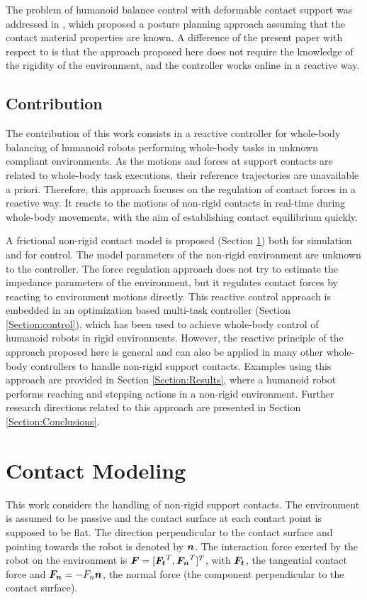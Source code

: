 \documentclass[letterpaper, 10 pt, conference]{ieeeconf}  %
\newcommand{\vect}[1]{\mbox{\boldmath${#1}$}}%
\begin{document}
The problem of humanoid balance control with deformable contact support was addressed in \cite{Bouyarmane11b}, which proposed a posture planning approach assuming that the contact material properties are known. A difference of the present paper with respect to \cite{Bouyarmane11b} is that the approach proposed here does not require the knowledge of the rigidity of the environment, and the controller works online in a reactive way.

\subsection{Contribution}
The contribution of this work consists in a reactive controller for whole-body balancing of humanoid robots performing whole-body tasks in unknown compliant environments. As the motions and forces at support contacts are related to whole-body task executions, their reference trajectories are unavailable a priori. Therefore, this approach focuses on the regulation of contact forces in a reactive way. It reacts to the motions of non-rigid contacts in real-time during whole-body movements, with the aim of establishing contact equilibrium quickly. 

A frictional non-rigid contact model is proposed (Section \ref{Section:modeling}) both for simulation and for control. The model parameters of the non-rigid environment are unknown to the controller. The force regulation approach does not try to estimate the impedance parameters of the environment, but it regulates contact forces by reacting to environment motions directly. This reactive control approach is embedded in an optimization based multi-task controller (Section \ref{Section:control}), which has been used to achieve whole-body control of humanoid robots in rigid environments. However, the reactive principle of the approach proposed here is general and can also be applied in many other whole-body controllers to handle non-rigid support contacts. Examples using this approach are provided in Section \ref{Section:Results}, where a humanoid robot performs reaching and stepping actions in a non-rigid environment. Further research directions related to this approach are presented in Section \ref{Section:Conclusions}.
 

\section{Contact Modeling}
\label{Section:modeling}
This work considers the handling of non-rigid support contacts. The environment is assumed to be passive and the contact surface at each contact point is supposed to be flat. The direction perpendicular to the contact surface and pointing towards the robot is denoted by $\vect{n}$. The interaction force exerted by the robot on the environment is $\vect{F}=[\vect{F_t}^T, \vect{F_n}^T]^T$, with $\vect{F_t}$, the tangential contact force and $\vect{F_n} = -F_n\vect{n}$, the normal force (the component perpendicular to the contact surface).  
\end{document}
